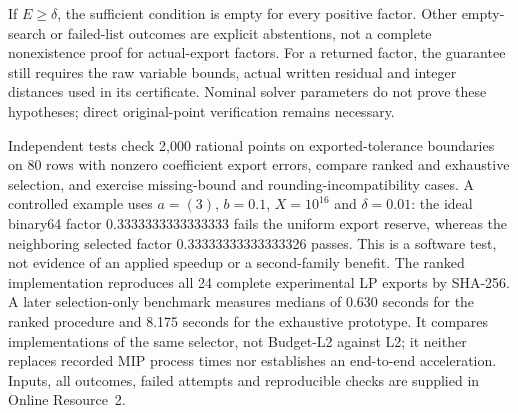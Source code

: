 If $E\ge\delta$, the sufficient condition is empty for every positive factor.
Other empty-search or failed-list outcomes are explicit abstentions, not a
complete nonexistence proof for actual-export factors. For a returned factor,
the guarantee still requires the raw variable bounds, actual written residual
and integer distances used in its certificate. Nominal solver parameters do not
prove these hypotheses; direct original-point verification remains necessary.

Independent tests check 2,000 rational points on exported-tolerance boundaries
on 80 rows with nonzero coefficient export errors, compare ranked and exhaustive
selection, and exercise missing-bound and rounding-incompatibility cases.
A controlled example uses $a=(3)$, $b=0.1$, $X=10^{16}$ and $\delta=0.01$:
the ideal binary64 factor 0.3333333333333333 fails the uniform export reserve,
whereas the neighboring selected factor 0.33333333333333326 passes. This is a
software test, not evidence of an applied speedup or a second-family benefit.
The ranked implementation reproduces all 24 complete experimental LP exports
by SHA-256. A later selection-only benchmark measures medians of 0.630 seconds
for the ranked procedure and 8.175 seconds for the exhaustive prototype.
It compares implementations of the same selector, not Budget-L2 against L2;
it neither replaces recorded MIP process times nor establishes an end-to-end
acceleration. Inputs, all outcomes, failed attempts and reproducible checks are
supplied in Online Resource~2.
